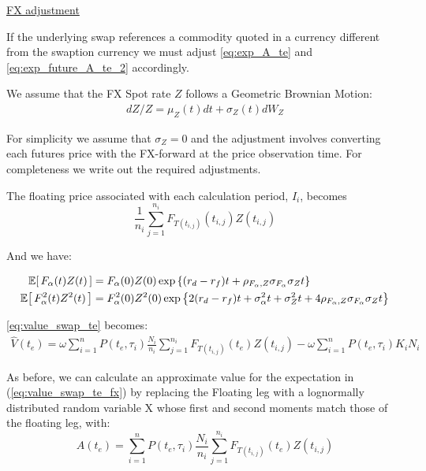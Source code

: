 \underline{FX adjustment}

If the underlying swap references a commodity quoted in a currency different from the swaption currency we must adjust \eqref{eq:exp_A_te} and \eqref{eq:exp_future_A_te_2} accordingly.

We assume that the FX Spot rate $Z$  follows a Geometric Brownian Motion:
\begin{equation}
\label{eq:fx_rate_dynamics}
\begin{split}
dZ/Z = \mu_{Z}(t)dt + \sigma_{Z}(t) dW_{Z}
\end{split}
\end{equation}

For simplicity we assume that $\sigma_{Z}=0$ and the adjustment involves converting each futures price with the FX-forward at the price observation time. For completeness we write out the required adjustments.

The floating price associated with each calculation period, $I_i$, becomes
\begin{equation}
\frac{1}{n_i} \sum_{j=1}^{n_i} F_{T(t_{i,j})}(t_{i,j}) Z(t_{i,j})
\end{equation}

And we have:

\begingroup
\addtolength{\jot}{0.5em}
\begin{align}
\Ex{F_{\alpha}(t)Z(t)} &= F_{\alpha}(0) Z(0) \exp \left\{ (r_d - r_f) t + \rho_{F_{\alpha}, Z} \sigma_{F_{\alpha}} \sigma_{Z} t \right\} \label{eq:future_fx_exp_product} \\
\Ex{F^2_{\alpha}(t)Z^2(t)} &= F^2_{\alpha}(0)Z^2(0) \exp \left\{ 2 (r_d - r_f) t + \sigma^2_{\alpha} t + \sigma^2_{Z} t + 4 \rho_{F_{\alpha}, Z} \sigma_{F_{\alpha}} \sigma_{Z} t \right\} \label{eq:future_fx_square}
\end{align}
\endgroup

\eqref{eq:value_swap_te} becomes:
\begin{equation}
\label{eq:value_swap_te_fx}
\begin{split}
\hat{V}(t_e) = \omega \sum_{i=1}^{n} P(t_e, \tau_i) \frac{N_i}{n_i} \sum_{j=1}^{n_i} F_{T(t_{i,j})}(t_e) Z(t_{i,j}) - \omega \sum_{i=1}^{n} P(t_e, \tau_i) K_i N_i
\end{split}
\end{equation}

As before, we can calculate an approximate value for the expectation in (\eqref{eq:value_swap_te_fx}) by replacing the Floating leg with a lognormally distributed random variable X whose first and second moments match those of the floating leg, with:
\begin{equation}
A(t_e) = \sum_{i=1}^{n} P(t_e, \tau_i) \frac{N_i}{n_i} \sum_{j=1}^{n_i} F_{T(t_{i,j})}(t_e) Z(t_{i,j})
\end{equation}

